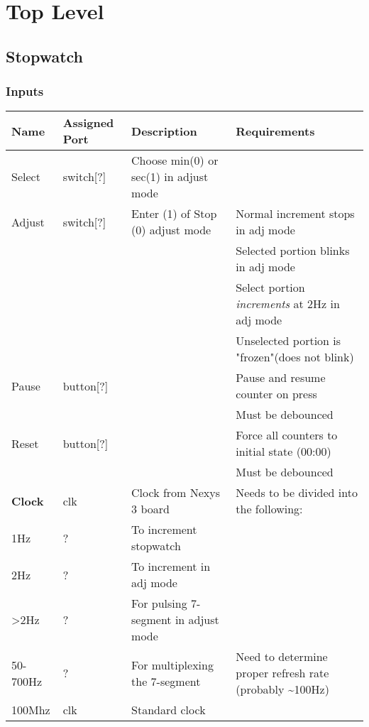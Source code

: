 \documentclass[11pt]{article}
\author{Rob Royce}
\date{\today}
\title{}
\begin{document}
\tableofcontents

\section{Top Level}
\label{sec:orgb51f784}

\subsection{Stopwatch}
\label{sec:org88649d0}

\subsubsection{Inputs}
\label{sec:org31cc159}

\begin{center}
\begin{tabular}{llll}
Name & Assigned Port & Description & Requirements\\
\hline
Select & switch[?] & Choose min(0) or sec(1) in adjust mode & \\
\hline
Adjust & switch[?] & Enter (1) of Stop (0) adjust mode & Normal increment stops in adj mode\\
 &  &  & Selected portion blinks in adj mode\\
 &  &  & Select portion \emph{increments} at 2Hz in adj mode\\
 &  &  & Unselected portion is "frozen"(does not blink)\\
\hline
Pause & button[?] &  & Pause and resume counter on press\\
 &  &  & Must be debounced\\
\hline
Reset & button[?] &  & Force all counters to initial state (00:00)\\
 &  &  & Must be debounced\\
\hline
\textbf{Clock} & clk & Clock from Nexys 3 board & Needs to be divided into the following:\\
1Hz & ? & To increment stopwatch & \\
2Hz & ? & To increment in adj mode & \\
>2Hz & ? & For pulsing 7-segment in adjust mode & \\
50-700Hz & ? & For multiplexing the 7-segment & Need to determine proper refresh rate (probably \textasciitilde{}100Hz)\\
100Mhz & clk & Standard clock & \\
\hline
\end{tabular}
\end{center}
\end{document}

